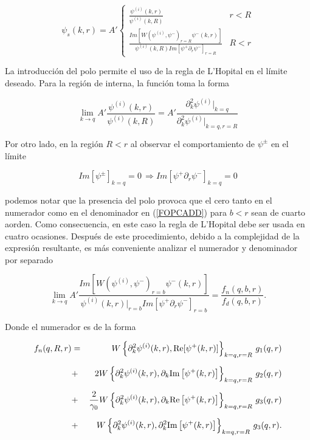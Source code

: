 \begin{equation}
\psi_s(k,r)=A' \begin{cases}
\frac{\psi^{(i)}(k,r)}{\psi^{(i)}(k,R)} & r < R
\\ \frac{Im[W(\psi^{(i)},\psi^{-})_{r=R}\psi^{-}(k,r)]}{\psi^{(i)}(k,R) Im [\psi^{+} \partial_r \psi^{-}]_{r=R}} & R < r
\end{cases}
\label{FOPCADD}
\end{equation}

La introducción del polo permite el uso de la regla de L'Hopital en el límite deseado. Para la región de interna, la función toma la forma 

\begin{equation*}
\lim_{k \to q} A' \frac{\psi^{(i)}(k,r)}{\psi^{(i)}(k,R)} =  A' \frac{\partial^2_k \psi^{(i)}|_{k=q}}{\partial^2_k \psi^{(i)}|_{k=q,r=R}}
\end{equation*}


Por otro lado, en la región $R < r$ al observar el comportamiento de $\psi^{\pm}$ en el límite

\begin{equation*}
Im[\psi^{\pm}]_{k=q} =0\, \Longrightarrow Im [\psi^{+} \partial_r \psi^{-}]_{k=q} = 0
\end{equation*}


podemos notar que la presencia del polo provoca que el cero tanto en el numerador como en el denominador en (\ref{FOPCADD})  para $b < r$ sean de cuarto aorden. Como consecuencia, en este caso la regla de L'Hopital debe ser usada en cuatro ocasiones. Después de este procedimiento, debido a la complejidad de la expresión resultante, es más conveniente analizar el numerador  y denominador por separado


\begin{equation*}
\lim_{k \to q} A' \frac{Im[W(\psi^{(i)},\psi^{-})_{r=b}\psi^{-}(k,r)]}{\psi^{(i)}(k,r)|_{r=b} Im [\psi^{+} \partial_r \psi^{-}]_{r=b}} = \frac{f_n(q,b,r)}{f_d(q,b,r)}.
\end{equation*}

Donde el numerador es de la forma

\begin{eqnarray*}
	f_n(q,R,r)&=& W \left\{\partial^2_k\psi^{(i)}(k,r), {\rm Re}[\psi^{+} (k,r)]\right \}_{k = q, r = R} \,g_1(q,r)\\[0.2cm]
	&+&2 W \left\{\partial^2_k\psi^{(i)}(k,r), \partial_{k}{\rm Im}\left[\psi^{+}(k,r)\right] \right\}_{k=q,r=R}\, g_2(q,r)\\[0.2cm]
	&+&\frac{2}{\gamma_0} W \left\{ \partial^2_k \psi^{(i)}(k,r), \partial_{k}{\rm Re}\left[\psi^{+}(k,r)\right]\right\}_{k=q,r=R} \,g_3(q,r)\\[0.2cm]
	&+& W \left\{ \partial^2_{k}\psi^{(i)}(k,r),\partial^2_k {\rm Im}\left[\psi^{+}(k,r)\right] \right\}_{k=q, r=R}\, g_3(q,r).
\end{eqnarray*}


